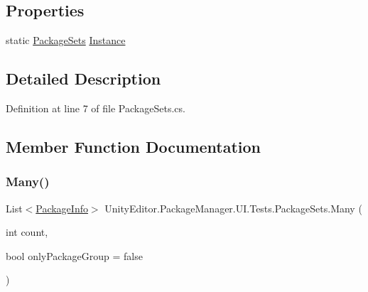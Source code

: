 \subsection*{Properties}
\begin{DoxyCompactItemize}
\item 
static \mbox{\hyperlink{class_unity_editor_1_1_package_manager_1_1_u_i_1_1_tests_1_1_package_sets}{Package\+Sets}} \mbox{\hyperlink{class_unity_editor_1_1_package_manager_1_1_u_i_1_1_tests_1_1_package_sets_a8330e0a210e88e4598e34dbef1a17430}{Instance}}
\end{DoxyCompactItemize}


\subsection{Detailed Description}


Definition at line 7 of file Package\+Sets.\+cs.



\subsection{Member Function Documentation}
\mbox{\label{class_unity_editor_1_1_package_manager_1_1_u_i_1_1_tests_1_1_package_sets_a86750fa77ba04573c7eaa5d605576a6a}} 
\subsubsection{\texorpdfstring{Many()}{Many()}\hspace{0.1cm}{\footnotesize\ttfamily [1/2]}}
{\footnotesize\ttfamily List$<$\mbox{\hyperlink{class_unity_editor_1_1_package_manager_1_1_u_i_1_1_package_info}{Package\+Info}}$>$ Unity\+Editor.\+Package\+Manager.\+U\+I.\+Tests.\+Package\+Sets.\+Many (\begin{DoxyParamCaption}\item[{int}]{count,  }\item[{bool}]{only\+Package\+Group = {\ttfamily false} }\end{DoxyParamCaption})}



